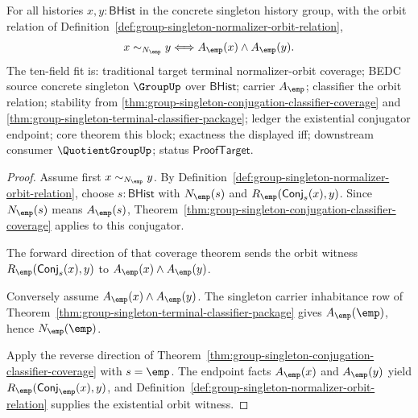 \begin{theorem}
\label{thm:group-singleton-normalizer-orbit-total-coverage}
For all histories $x,y:\mathsf{BHist}$ in the concrete singleton history group,
with the orbit relation of
Definition~\ref{def:group-singleton-normalizer-orbit-relation},
$$
x\sim_{N_{\emp}}y \Longleftrightarrow A_{\emp}(x)\land A_{\emp}(y).
$$
The ten-field fit is: traditional target terminal normalizer-orbit coverage;
BEDC source concrete singleton $\GroupUp$ over $\mathsf{BHist}$; carrier
$A_{\emp}$; classifier the orbit relation; stability from
\autoref{thm:group-singleton-conjugation-classifier-coverage} and
\autoref{thm:group-singleton-terminal-classifier-package}; ledger the
existential conjugator endpoint; core theorem this block; exactness the
displayed iff; downstream consumer $\QuotientGroupUp$; status
$\mathsf{ProofTarget}$.
\end{theorem}
\begin{proof}
Assume first $x\sim_{N_{\emp}}y$. By
Definition~\ref{def:group-singleton-normalizer-orbit-relation}, choose
$s:\mathsf{BHist}$ with $N_{\emp}(s)$ and
$R_{\emp}(\mathsf{Conj}_s(x),y)$. Since $N_{\emp}(s)$ means
$A_{\emp}(s)$, Theorem~\ref{thm:group-singleton-conjugation-classifier-coverage}
applies to this conjugator.

The forward direction of that coverage theorem sends the orbit witness
$R_{\emp}(\mathsf{Conj}_s(x),y)$ to
$A_{\emp}(x)\land A_{\emp}(y)$.

Conversely assume $A_{\emp}(x)\land A_{\emp}(y)$. The singleton carrier
inhabitance row of Theorem~\ref{thm:group-singleton-terminal-classifier-package}
gives $A_{\emp}(\emp)$, hence $N_{\emp}(\emp)$.

Apply the reverse direction of
Theorem~\ref{thm:group-singleton-conjugation-classifier-coverage} with
$s=\emp$. The endpoint facts $A_{\emp}(x)$ and $A_{\emp}(y)$ yield
$R_{\emp}(\mathsf{Conj}_{\emp}(x),y)$, and
Definition~\ref{def:group-singleton-normalizer-orbit-relation} supplies the
existential orbit witness.
\end{proof}

